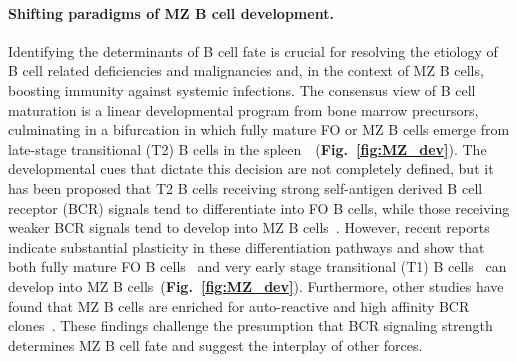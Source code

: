 \documentclass[11pt]{article}
\newcommand{\para}[1]{\vspace*{-4.5mm}\paragraph{#1}}
\begin{document}
\para{Shifting paradigms of MZ B cell development.}
Identifying the determinants of B cell fate is crucial for resolving the etiology of B cell related deficiencies and malignancies and, in the context of MZ B cells,  boosting immunity against systemic infections. 
The consensus view of B cell maturation is a linear developmental program from bone marrow precursors, culminating in a bifurcation in which fully mature FO or MZ B cells emerge from late-stage transitional (T2) B cells in the spleen~\cite{Allman_1993, Rolink_1998,  Loder_1999,  Allman_2001, Su_2002,  Pillai_2005, Verma_2007, Allman_2008}~(\textbf{Fig.~\ref{fig:MZ_dev}}). 
The developmental cues that dictate this decision are not completely defined, but it has been proposed that T2 B cells receiving strong self-antigen derived B cell receptor (BCR) signals tend to differentiate into FO B cells, while those receiving weaker BCR signals tend to develop into MZ B cells~\cite{Cariappa_2001, Seo_2001, Samardzic_2002,  Pillai_2005}.
However, recent reports indicate substantial plasticity in these differentiation pathways and show that both fully mature FO B cells~\cite{Lechner_2021}  and very early stage transitional (T1) B cells~\cite{ Tan_2009, Roundy_2010, Hampel_2011} can develop into MZ B cells~(\textbf{Fig.~\ref{fig:MZ_dev}}). Furthermore, other studies have found that MZ B cells are enriched for auto-reactive and high affinity BCR clones~\cite{Martin_2001, Yang_Shih_2002, Zikherman_2012, Tsiantoulas_2017}. 
These findings challenge the presumption that BCR signaling strength determines MZ B cell fate and suggest the interplay of other forces.
\end{document}
